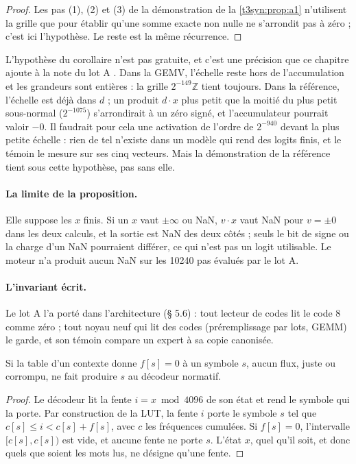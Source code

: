\begin{proof}
Les pas (1), (2) et (3) de la démonstration de la \cref{t3syn:prop:a1} n'utilisent la grille que pour établir qu'une somme exacte non nulle ne s'arrondit pas à zéro ; c'est ici l'hypothèse. Le reste est la même récurrence.
\end{proof}

L'hypothèse du corollaire n'est pas gratuite, et c'est une précision que ce chapitre ajoute à la note du lot A \calc. Dans la GEMV, l'échelle reste hors de l'accumulation et les grandeurs sont entières : la grille $2^{-149}\mathbb{Z}$ tient toujours. Dans la référence, l'échelle est déjà dans $d$ ; un produit $d\cdot x$ plus petit que la moitié du plus petit sous-normal ($2^{-1075}$) s'arrondirait à un zéro signé, et l'accumulateur pourrait valoir $-0$. Il faudrait pour cela une activation de l'ordre de $2^{-940}$ devant la plus petite échelle : rien de tel n'existe dans un modèle qui rend des logits finis, et le témoin le mesure sur ses cinq vecteurs. Mais la démonstration de la référence tient sous cette hypothèse, pas sans elle.

\paragraph{La limite de la proposition.} Elle suppose les $x$ finis. Si un $x$ vaut $\pm\infty$ ou NaN, $v \cdot x$ vaut NaN pour $v = \pm 0$ dans les deux calculs, et la sortie est NaN des deux côtés ; seuls le bit de signe ou la charge d'un NaN pourraient différer, ce qui n'est pas un logit utilisable. Le moteur n'a produit aucun NaN sur les \num{10240} pas évalués par le lot A.

\paragraph{L'invariant écrit.} Le lot A l'a porté dans l'architecture (§ 5.6) : tout lecteur de codes lit le code 8 comme zéro ; tout noyau neuf qui lit des codes (préremplissage par lots, GEMM) le garde, et son témoin compare un expert à sa copie canonisée.

\begin{lemme}\label{t3cod:lem:tables}
Si la table d'un contexte donne $f[s] = 0$ à un symbole $s$, aucun flux, juste ou corrompu, ne fait produire $s$ au décodeur normatif.
\end{lemme}

\begin{proof}
Le décodeur lit la fente $i = x \bmod 4096$ de son état et rend le symbole qui la porte. Par construction de la LUT, la fente $i$ porte le symbole $s$ tel que $c[s] \le i < c[s] + f[s]$, avec $c$ les fréquences cumulées. Si $f[s] = 0$, l'intervalle $[c[s], c[s])$ est vide, et aucune fente ne porte $s$. L'état $x$, quel qu'il soit, et donc quels que soient les mots lus, ne désigne qu'une fente.
\end{proof}

